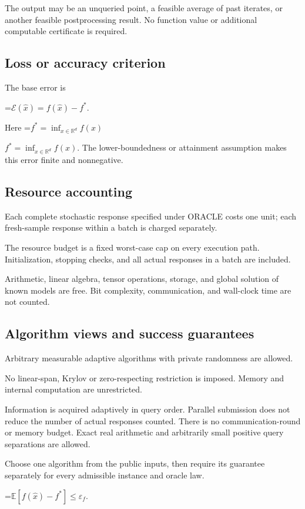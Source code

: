 \documentclass[10pt,a4paper]{article}
\newcommand{\AtlasMath}[1]{\par\begingroup\centering\setbox0=\hbox{$\displaystyle #1$}\ifdim\wd0>1.4\linewidth\typeout{ATLAS WIDE FORMULA: \the\wd0}\fi\ifdim\wd0>\linewidth\resizebox{\linewidth}{!}{\box0}\else\box0\fi\par\endgroup}
\newcommand{\AtlasInlineMath}[1]{\begingroup\setbox0=\hbox{$#1$}\ifdim\wd0>.4\linewidth\endgroup\AtlasMath{#1}\else\endgroup$#1$\fi}
\begin{document}
The output may be an unqueried point, a feasible average of past iterates, or another feasible postprocessing result. No function value or additional computable certificate is required.

\subsection{Loss or accuracy criterion}
The base error is


\AtlasMath{\mathcal{E}(\widehat{x})=f(\widehat{x})-f^*.}


Here \AtlasInlineMath{f^*=\inf_{x\in \mathbb{R}^d}f(x)}. The lower-boundedness or attainment assumption makes this error finite and nonnegative.

\subsection{Resource accounting}
Each complete stochastic response specified under ORACLE costs one unit; each fresh-sample response within a batch is charged separately.

The resource budget is a fixed worst-case cap on every execution path. Initialization, stopping checks, and all actual responses in a batch are included.

Arithmetic, linear algebra, tensor operations, storage, and global solution of known models are free. Bit complexity, communication, and wall-clock time are not counted.

\subsection{Algorithm views and success guarantees}
Arbitrary measurable adaptive algorithms with private randomness are allowed.

No linear-span, Krylov or zero-respecting restriction is imposed. Memory and internal computation are unrestricted.

Information is acquired adaptively in query order. Parallel submission does not reduce the number of actual responses counted. There is no communication-round or memory budget. Exact real arithmetic and arbitrarily small positive query separations are allowed.

Choose one algorithm from the public inputs, then require its guarantee separately for every admissible instance and oracle law.


\AtlasMath{\mathbb{E}\!\left[f(\widehat{x})-f^*\right]\le \varepsilon_f.}
\end{document}
